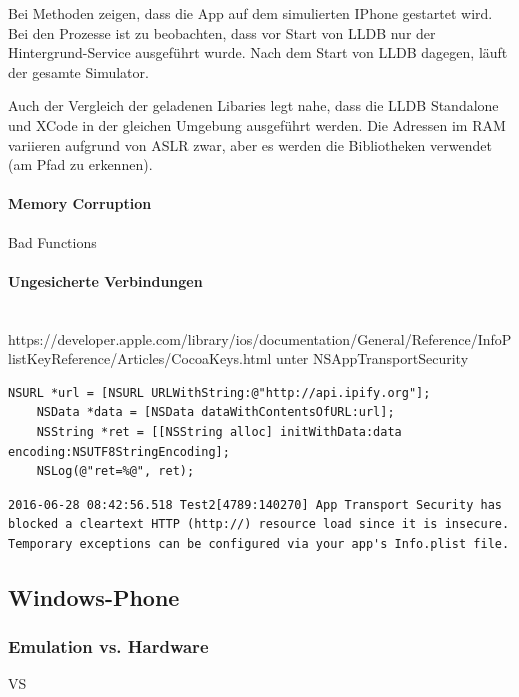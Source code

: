 Bei Methoden zeigen, dass die App auf dem simulierten IPhone gestartet wird. Bei den Prozesse ist zu beobachten, dass vor Start von LLDB nur der Hintergrund-Service ausgeführt wurde. Nach dem Start von LLDB dagegen, läuft der gesamte Simulator.

Auch der Vergleich der geladenen Libaries legt nahe, dass die LLDB Standalone und XCode in der gleichen Umgebung ausgeführt werden. Die Adressen im RAM variieren aufgrund von ASLR zwar, aber es werden die Bibliotheken verwendet (am Pfad zu erkennen).

\begin{figure}[htbp]

\label{fig:LLDB-creating-IPhone-VM}
\end{figure}

\paragraph{Memory Corruption}
Bad Functions


\paragraph{Ungesicherte Verbindungen}$ $\\
https://developer.apple.com/library/ios/documentation/General/Reference/InfoPlistKeyReference/Articles/CocoaKeys.html unter NSAppTransportSecurity

\begin{lstlisting}
NSURL *url = [NSURL URLWithString:@"http://api.ipify.org"];
    NSData *data = [NSData dataWithContentsOfURL:url];
    NSString *ret = [[NSString alloc] initWithData:data encoding:NSUTF8StringEncoding];
    NSLog(@"ret=%@", ret);
\end{lstlisting}

\begin{lstlisting}
2016-06-28 08:42:56.518 Test2[4789:140270] App Transport Security has blocked a cleartext HTTP (http://) resource load since it is insecure. Temporary exceptions can be configured via your app's Info.plist file.
\end{lstlisting}


		\subsection{Windows-Phone}
			\subsubsection{Emulation vs. Hardware}
			VS

